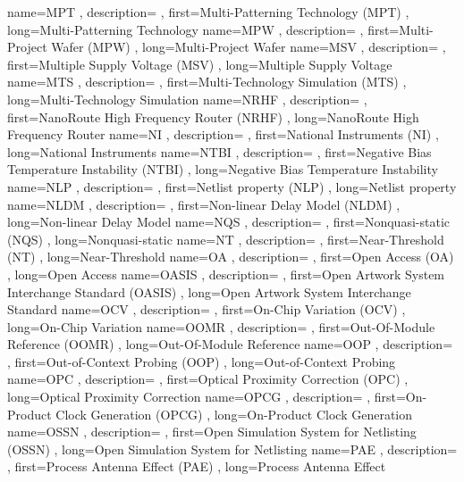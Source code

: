 { name={MPT}
, description={}
, first={Multi-Patterning Technology (MPT)}
, long={Multi-Patterning Technology}
}
{ name={MPW}
, description={}
, first={Multi-Project Wafer (MPW)}
, long={Multi-Project Wafer}
}
{ name={MSV}
, description={}
, first={Multiple Supply Voltage (MSV)}
, long={Multiple Supply Voltage}
}
{ name={MTS}
, description={}
, first={Multi-Technology Simulation (MTS)}
, long={Multi-Technology Simulation}
}
{ name={NRHF}
, description={}
, first={NanoRoute High Frequency Router (NRHF)}
, long={NanoRoute High Frequency Router}
}
{ name={NI}
, description={}
, first={National Instruments (NI)}
, long={National Instruments}
}
{ name={NTBI}
, description={}
, first={Negative Bias Temperature Instability (NTBI)}
, long={Negative Bias Temperature Instability}
}
{ name={NLP}
, description={}
, first={Netlist property (NLP)}
, long={Netlist property}
}
{ name={NLDM}
, description={}
, first={Non-linear Delay Model (NLDM)}
, long={Non-linear Delay Model}
}
{ name={NQS}
, description={}
, first={Nonquasi-static (NQS)}
, long={Nonquasi-static}
}
{ name={NT}
, description={}
, first={Near-Threshold (NT)}
, long={Near-Threshold}
}
{ name={OA}
, description={}
, first={Open Access (OA)}
, long={Open Access}
}
{ name={OASIS}
, description={}
, first={Open Artwork System Interchange Standard (OASIS)}
, long={Open Artwork System Interchange Standard}
}
{ name={OCV}
, description={}
, first={On-Chip Variation (OCV)}
, long={On-Chip Variation}
}
{ name={OOMR}
, description={}
, first={Out-Of-Module Reference (OOMR)}
, long={Out-Of-Module Reference}
}
{ name={OOP}
, description={}
, first={Out-of-Context Probing (OOP)}
, long={Out-of-Context Probing}
}
{ name={OPC}
, description={}
, first={Optical Proximity Correction (OPC)}
, long={Optical Proximity Correction}
}
{ name={OPCG}
, description={}
, first={On-Product Clock Generation (OPCG)}
, long={On-Product Clock Generation}
}
{ name={OSSN}
, description={}
, first={Open Simulation System for Netlisting (OSSN)}
, long={Open Simulation System for Netlisting}
}
{ name={PAE}
, description={}
, first={Process Antenna Effect (PAE)}
, long={Process Antenna Effect}
}
